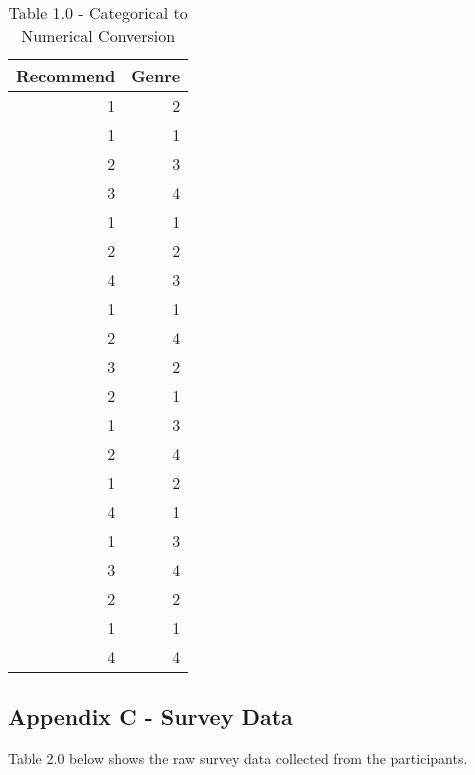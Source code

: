 \documentclass[
  letterpaper,
  DIV=11,
  numbers=noendperiod]{scrartcl}
\begin{document}
\begin{table}

\caption{\label{tab:table and plot}Table 1.0 - Categorical to Numerical Conversion}
\centering
\begin{tabular}[t]{r|r}
\hline
Recommend & Genre\\
\hline
1 & 2\\
\hline
1 & 1\\
\hline
2 & 3\\
\hline
3 & 4\\
\hline
1 & 1\\
\hline
2 & 2\\
\hline
4 & 3\\
\hline
1 & 1\\
\hline
2 & 4\\
\hline
3 & 2\\
\hline
2 & 1\\
\hline
1 & 3\\
\hline
2 & 4\\
\hline
1 & 2\\
\hline
4 & 1\\
\hline
1 & 3\\
\hline
3 & 4\\
\hline
2 & 2\\
\hline
1 & 1\\
\hline
4 & 4\\
\hline
\end{tabular}
\end{table}

\subsection{Appendix C - Survey Data}\label{appendix-c---survey-data}

Table 2.0 below shows the raw survey data collected from the
participants.
\end{document}
